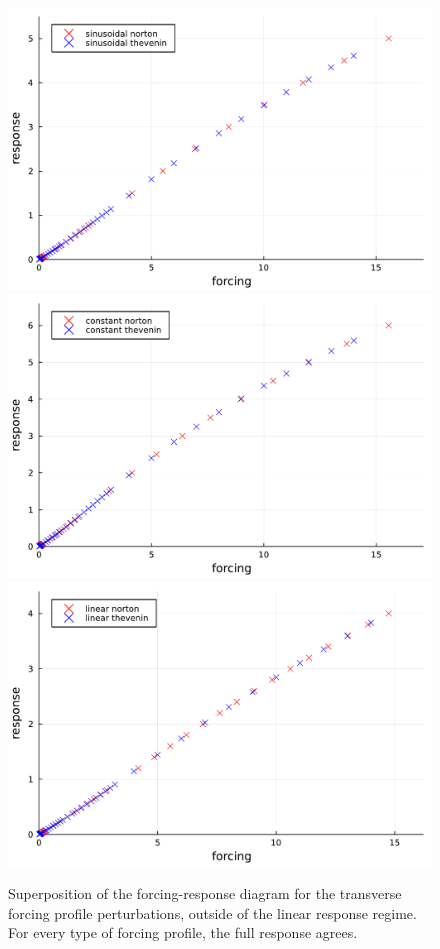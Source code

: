 \begin{figure}[htbp]
    \begin{center}
      \includegraphics[width=0.7\linewidth]{figures/sinusoidal_joint.pdf}
      \includegraphics[width=0.7\linewidth]{figures/constant_joint.pdf}
      \includegraphics[width=0.7\linewidth]{figures/linear_joint.pdf}
      \caption{ \label{fig:norton_sv_nonlinear_responses}
        Superposition of the forcing-response diagram for the transverse forcing profile perturbations, outside of the linear response regime.
        For every type of forcing profile, the full response agrees.
      }
    \end{center}
  \end{figure}